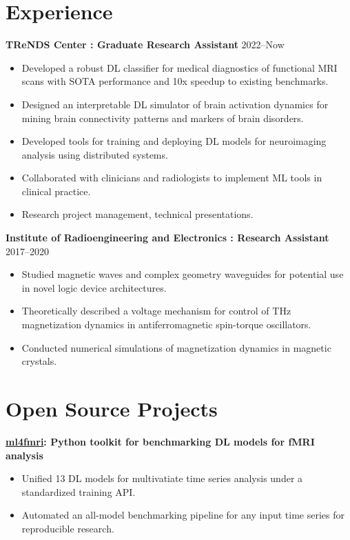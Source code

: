 \documentclass[11pt,a4paper]{article}
\begin{document}
\section*{Experience}
\textbf{TReNDS Center : Graduate Research Assistant} \hfill 2022--Now
\begin{itemize}[leftmargin=*,noitemsep]
    \item Developed a robust DL classifier for medical diagnostics of functional MRI scans with SOTA performance and 10x speedup to existing benchmarks.
    \item Designed an interpretable DL simulator of brain activation dynamics for mining brain connectivity patterns and markers of brain disorders.
    \item Developed tools for training and deploying DL models for neuroimaging analysis using distributed systems.
    \item Collaborated with clinicians and radiologists to implement ML tools in clinical practice.
    \item Research project management, technical presentations.
\end{itemize}

\textbf{Institute of Radioengineering and Electronics : Research Assistant} \hfill 2017--2020
\begin{itemize}[leftmargin=*,noitemsep]
    \item Studied magnetic waves and complex geometry waveguides for potential use in novel logic device architectures.
    \item Theoretically described a voltage mechanism for control of THz magnetization dynamics in antiferromagnetic spin-torque oscillators.
    \item Conducted numerical simulations of magnetization dynamics in magnetic crystals.
\end{itemize}

\section*{Open Source Projects}
\textbf{\href{https://pypi.org/project/ml4fmri/}{ml4fmri}: Python toolkit for benchmarking DL models for fMRI analysis}
\begin{itemize}[leftmargin=*,noitemsep]
    \item Unified 13 DL models for multivatiate time series analysis under a standardized training API.
    \item Automated an all-model benchmarking pipeline for any input time series for reproducible research.
\end{itemize}
\end{document}
